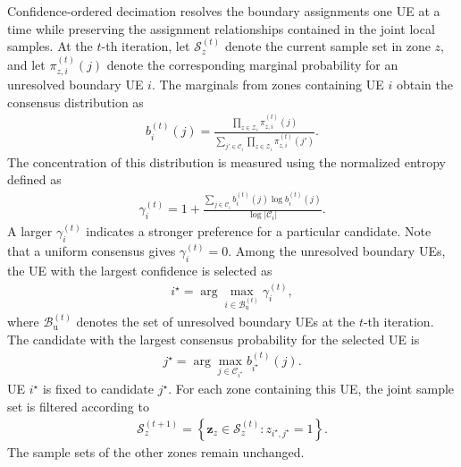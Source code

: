 \documentclass[journal]{IEEEtran}
\begin{document}
{Confidence-ordered decimation resolves the boundary assignments one UE at a time while preserving the assignment relationships contained in
the joint local samples. At the $t$-th iteration, let $\mathcal S_z^{(t)}$ denote the current sample set in zone $z$, and let
$\pi_{z,i}^{(t)}(j)$ denote the corresponding marginal probability for an unresolved boundary UE $i$. The marginals from zones containing
UE $i$ obtain the consensus distribution as
\begin{align}
b_i^{(t)}(j)=\frac{\prod_{z\in\mathcal Z_i}\pi_{z,i}^{(t)}(j)}{\sum_{j'\in\mathcal C_i}\prod_{z\in\mathcal Z_i}\pi_{z,i}^{(t)}(j')}.
\label{eq:app-consensus}
\end{align}
The concentration of this distribution is measured using the normalized
entropy defined as
\begin{align}
\gamma_i^{(t)}
=1+\frac{\sum_{j\in\mathcal C_i}b_i^{(t)}(j)\log b_i^{(t)}(j)}{\log|\mathcal C_i|}.
\label{eq:app-confidence}
\end{align}
A larger $\gamma_i^{(t)}$ indicates a stronger preference for a
particular candidate. Note that a uniform consensus gives
$\gamma_i^{(t)}=0$.
Among the unresolved boundary UEs, the UE with the largest confidence
is selected as
\begin{align}
i^\star=\arg\max_{i\in\mathcal B_{\mathrm u}^{(t)}}\gamma_i^{(t)},
\label{eq:app-select-ue}
\end{align}
where $\mathcal B_{\mathrm u}^{(t)}$ denotes the set of unresolved
boundary UEs at the $t$-th iteration. The candidate with the largest consensus
probability for the selected UE is
\begin{align}
j^\star=\arg\max_{j\in\mathcal C_{i^\star}}b_{i^\star}^{(t)}(j).
\label{eq:app-select-candidate}
\end{align}
UE $i^\star$ is fixed to candidate $j^\star$. For each zone containing
this UE, the joint sample set is filtered according to
\begin{align}
\mathcal S_z^{(t+1)}
=
\left\{
\bm z_z\in\mathcal S_z^{(t)}:
z_{i^\star,j^\star}=1
\right\}.
\label{eq:app-filter}
\end{align}
The sample sets of the other zones remain unchanged.

}
\end{document}
